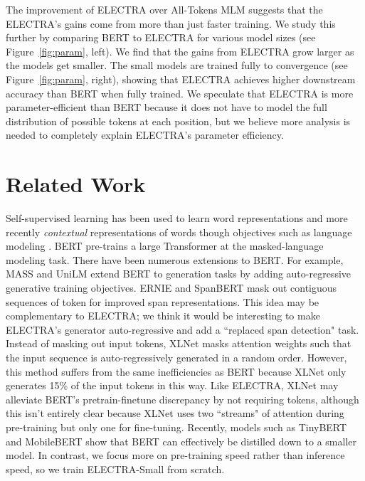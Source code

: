\documentclass{article}
\newcommand{\xhdr}[1]{\vspace{0mm}\noindent{{\bf #1}}\hspace{1.3mm}}
\begin{document}
The improvement of ELECTRA over All-Tokens MLM suggests that the ELECTRA's gains come from more than just faster training.  
We study this further by comparing BERT to ELECTRA for various model sizes (see Figure~\ref{fig:param}, left).
We find that the gains from ELECTRA grow larger as the models get smaller.
The small models are trained fully to convergence (see Figure~\ref{fig:param}, right), showing that ELECTRA achieves higher downstream accuracy than BERT when fully trained. 
We speculate that ELECTRA is more parameter-efficient than BERT because it does not have to model the full distribution of possible tokens at each position, but we believe more analysis is needed to completely explain ELECTRA's parameter efficiency. 



\section{Related Work}

\xhdr{Self-Supervised Pre-training for NLP} 
Self-supervised learning has been used to learn word representations \citep{Collobert2011NaturalLP,pennington2014glove} and more recently {\it contextual} representations of words though objectives such as language modeling \citep{dai2015semi,peters2018deep,howard2018universal}.
BERT \citep{devlin2018bert} pre-trains a large Transformer \citep{Vaswani2017AttentionIA} at the masked-language modeling 
task.
There have been numerous extensions to BERT.
For example, MASS \citep{song2019mass} and UniLM \citep{dong2019unified} extend BERT to generation tasks by adding auto-regressive generative training objectives. 
ERNIE \citep{sun2019ernie} and SpanBERT \citep{joshi2019spanbert} mask out contiguous sequences of token for improved span representations.
This idea may be complementary to ELECTRA; we think it would be interesting to make ELECTRA's generator auto-regressive and add a ``replaced span detection" task.
Instead of masking out input tokens, XLNet \citep{yang2019xlnet} masks attention weights such that the input sequence is auto-regressively generated in a random order. However, this method suffers from the same inefficiencies as BERT because XLNet only generates 15\% of the input tokens in this way.
Like ELECTRA, XLNet may alleviate BERT's pretrain-finetune discrepancy by not requiring  tokens, although this isn't entirely clear because XLNet uses two ``streams" of attention during pre-training but only one for fine-tuning.
Recently, models such as TinyBERT \citep{jiao2019tinybert} and MobileBERT \citep{sunmobilebert} show that BERT can effectively be distilled down to a smaller model.
In contrast, we focus more on pre-training speed rather than inference speed, so we train ELECTRA-Small from scratch.
\end{document}
